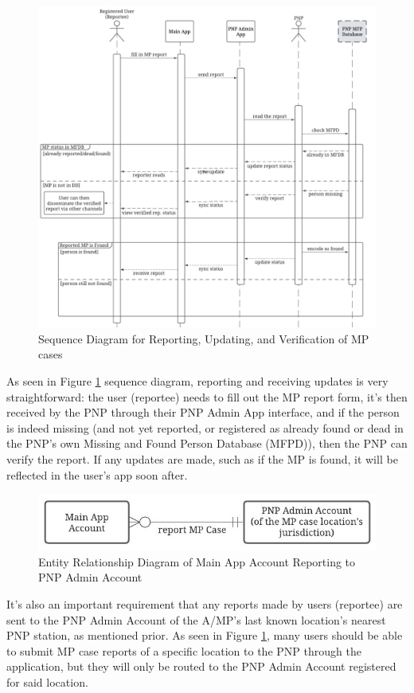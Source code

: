 \begin{figure}[!h]
    \centering
    \includegraphics{figures/Chapter3/Chapt3_seqDiag_report.jpeg}
    \caption{Sequence Diagram for Reporting, Updating, and Verification of MP cases}
    \label{fig:seqDiaReport}
\end{figure}
As seen in Figure \ref{fig:seqDiaReport} sequence diagram, reporting and receiving updates is very straightforward: the user (reportee) needs to fill out the MP report form, it’s then received by the PNP through their PNP Admin App interface, and if the person is indeed missing (and not yet reported, or registered as already found or dead in the PNP's own Missing and Found Person Database (MFPD)), then the PNP can verify the report. If any updates are made, such as if the MP is found, it will be reflected in the user’s app soon after.

\begin{figure}[!h]
    \centering
    \includegraphics[width=\textwidth]{figures/Chapter3/Chapt3_ERDiag_reporteePNP.jpeg}
    \caption{Entity Relationship Diagram of Main App Account Reporting to PNP Admin Account}
    \label{fig:ERDReportee}
\end{figure}
It’s also an important requirement that any reports made by users (reportee) are sent to the PNP Admin Account of the A/MP's last known location’s nearest PNP station, as mentioned prior. As seen in Figure \ref{fig:seqDiaReport}, many users should be able to submit MP case reports of a specific location to the PNP through the application, but they will only be routed to the PNP Admin Account registered for said location.

